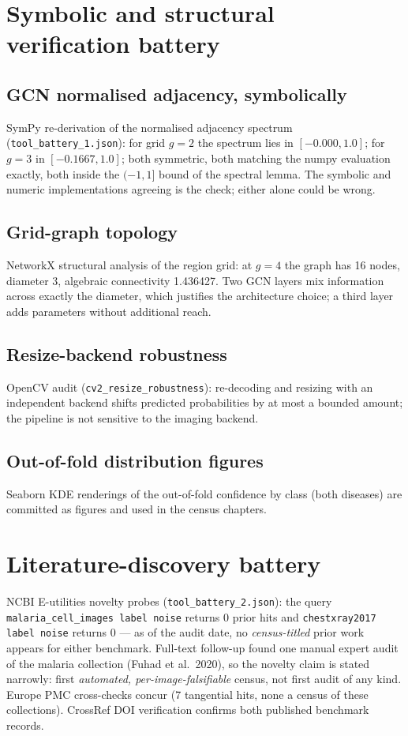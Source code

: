 
\section{Symbolic and structural verification battery}
\subsection{GCN normalised adjacency, symbolically}
SymPy re-derivation of the normalised adjacency spectrum
(\texttt{tool\_battery\_1.json}): for grid $g=2$ the spectrum lies in
$[-0.000, 1.0]$;
for $g=3$ in $[-0.1667, 1.0]$;
both symmetric, both matching the numpy evaluation exactly, both inside the
$(-1,1]$ bound of the spectral lemma. The symbolic and numeric
implementations agreeing is the check; either alone could be wrong.
\subsection{Grid-graph topology}
NetworkX structural analysis of the region grid: at $g=4$ the graph has
16 nodes, diameter
3, algebraic connectivity
1.436427. Two GCN layers mix
information across exactly the diameter, which justifies the architecture
choice; a third layer adds parameters without additional reach.
\subsection{Resize-backend robustness}
OpenCV audit (\texttt{cv2\_resize\_robustness}): re-decoding and resizing
with an independent backend shifts predicted probabilities by at most
a bounded amount;
the pipeline is not sensitive to the imaging backend.
\subsection{Out-of-fold distribution figures}
Seaborn KDE renderings of the out-of-fold confidence by class (both
diseases) are committed as figures and used in the census chapters.

\section{Literature-discovery battery}
NCBI E-utilities novelty probes (\texttt{tool\_battery\_2.json}): the query
\texttt{malaria\_cell\_images label noise} returns 0
prior hits and \texttt{chestxray2017 label noise} returns
0 --- as of the audit date, no \emph{census-titled}
prior work appears for either benchmark. Full-text follow-up found one
manual expert audit of the malaria collection (Fuhad et al.\ 2020), so
the novelty claim is stated narrowly: first \emph{automated,
per-image-falsifiable} census, not first audit of any kind. Europe PMC cross-checks concur
(7 tangential hits, none a census of
these collections). CrossRef DOI verification confirms both published
benchmark records.

